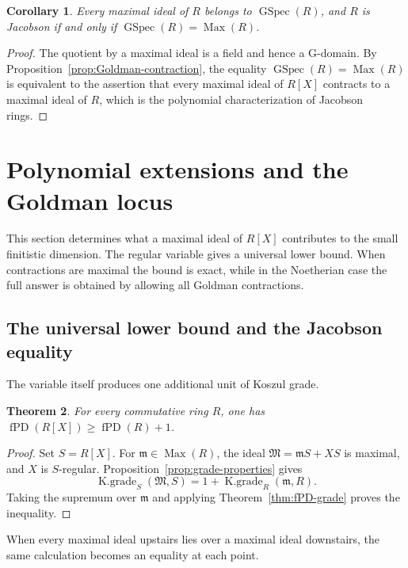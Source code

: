\documentclass[11pt]{amsart}
\numberwithin{equation}{section}
\newtheorem{theorem}{Theorem}[section]
\newtheorem{corollary}[theorem]{Corollary}
\theoremstyle{definition}
\theoremstyle{remark}
\newcommand{\fPD}{\operatorname{fPD}}
\newcommand{\Max}{\operatorname{Max}}
\newcommand{\GSpec}{\operatorname{GSpec}}
\newcommand{\Kgr}{\operatorname{K.grade}}
\begin{document}
\begin{corollary}\label{cor:GSpec-Jacobson}
Every maximal ideal of $R$ belongs to $\GSpec(R)$, and $R$ is Jacobson if and only if $\GSpec(R)=\Max(R)$.
\end{corollary}

\begin{proof}
The quotient by a maximal ideal is a field and hence a G-domain.  By Proposition~\ref{prop:Goldman-contraction}, the equality $\GSpec(R)=\Max(R)$ is equivalent to the assertion that every maximal ideal of $R[X]$ contracts to a maximal ideal of $R$, which is the polynomial characterization of Jacobson rings.
\end{proof}

\section{Polynomial extensions and the Goldman locus}\label{sec:polynomial}

This section determines what a maximal ideal of $R[X]$ contributes to the small finitistic dimension.  The regular variable gives a universal lower bound.  When contractions are maximal the bound is exact, while in the Noetherian case the full answer is obtained by allowing all Goldman contractions.

\subsection{The universal lower bound and the Jacobson equality}

The variable itself produces one additional unit of Koszul grade.

\begin{theorem}\label{thm:polynomial-lower}  \cite[Proposition 4.1]{ZhangII}
For every commutative ring $R$, one has $\fPD(R[X])\geq\fPD(R)+1$.
\end{theorem}

\begin{proof}
Set $S=R[X]$.  For $\mathfrak m\in\Max(R)$, the ideal $\mathfrak M=\mathfrak mS+XS$ is maximal, and $X$ is $S$-regular.  Proposition~\ref{prop:grade-properties} gives
\[
 \Kgr_S(\mathfrak M,S)
 =1+\Kgr_R(\mathfrak m,R).
\]
Taking the supremum over $\mathfrak m$ and applying Theorem~\ref{thm:fPD-grade} proves the inequality.
\end{proof}

When every maximal ideal upstairs lies over a maximal ideal downstairs, the same calculation becomes an equality at each point.
\end{document}
